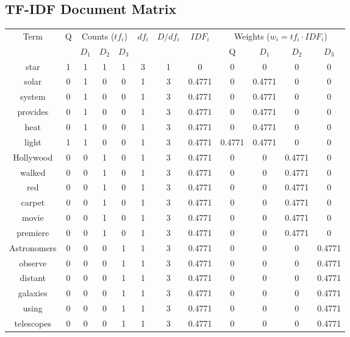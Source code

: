 \subsection{TF-IDF Document Matrix}
\begin{table}[H]
\centering
\small
\begin{tabular}{|c|c|ccc|c|c|c|c|ccc|}
\hline
\multirow{2}{*}{Term} & \multirow{2}{*}{Q} & \multicolumn{3}{c|}{Counts ($tf_i$)} & \multirow{2}{*}{$df_i$} & \multirow{2}{*}{$D/df_i$} & \multirow{2}{*}{$IDF_i$} & \multicolumn{4}{c|}{Weights ($w_i = tf_i \cdot IDF_i$)} \\
\cline{3-5} \cline{9-12}
 &  & $D_1$ & $D_2$ & $D_3$ &  &  &  & Q & $D_1$ & $D_2$ & $D_3$ \\
\hline
star         & 1 & 1 & 1 & 1 & 3 & 1   & 0      & 0      & 0      & 0      & 0 \\
solar        & 0 & 1 & 0 & 0 & 1 & 3 & 0.4771 & 0      & 0.4771 & 0      & 0 \\
system       & 0 & 1 & 0 & 0 & 1 & 3 & 0.4771 & 0      & 0.4771 & 0      & 0 \\
provides     & 0 & 1 & 0 & 0 & 1 & 3 & 0.4771 & 0      & 0.4771 & 0      & 0 \\
heat         & 0 & 1 & 0 & 0 & 1 & 3 & 0.4771 & 0      & 0.4771 & 0      & 0 \\
light        & 1 & 1 & 0 & 0 & 1 & 3 & 0.4771 & 0.4771 & 0.4771 & 0      & 0 \\
Hollywood    & 0 & 0 & 1 & 0 & 1 & 3 & 0.4771 & 0      & 0      & 0.4771 & 0 \\
walked       & 0 & 0 & 1 & 0 & 1 & 3 & 0.4771 & 0      & 0      & 0.4771 & 0 \\
red          & 0 & 0 & 1 & 0 & 1 & 3 & 0.4771 & 0      & 0      & 0.4771 & 0 \\
carpet       & 0 & 0 & 1 & 0 & 1 & 3 & 0.4771 & 0      & 0      & 0.4771 & 0 \\
movie        & 0 & 0 & 1 & 0 & 1 & 3 & 0.4771 & 0      & 0      & 0.4771 & 0 \\
premiere     & 0 & 0 & 1 & 0 & 1 & 3 & 0.4771 & 0      & 0      & 0.4771 & 0 \\
Astronomers  & 0 & 0 & 0 & 1 & 1 & 3 & 0.4771 & 0      & 0      & 0      & 0.4771 \\
observe      & 0 & 0 & 0 & 1 & 1 & 3 & 0.4771 & 0      & 0      & 0      & 0.4771 \\
distant      & 0 & 0 & 0 & 1 & 1 & 3 & 0.4771 & 0      & 0      & 0      & 0.4771 \\
galaxies     & 0 & 0 & 0 & 1 & 1 & 3 & 0.4771 & 0      & 0      & 0      & 0.4771 \\
using        & 0 & 0 & 0 & 1 & 1 & 3 & 0.4771 & 0      & 0      & 0      & 0.4771 \\
telescopes   & 0 & 0 & 0 & 1 & 1 & 3 & 0.4771 & 0      & 0      & 0      & 0.4771 \\
\hline
\end{tabular}
\end{table}

